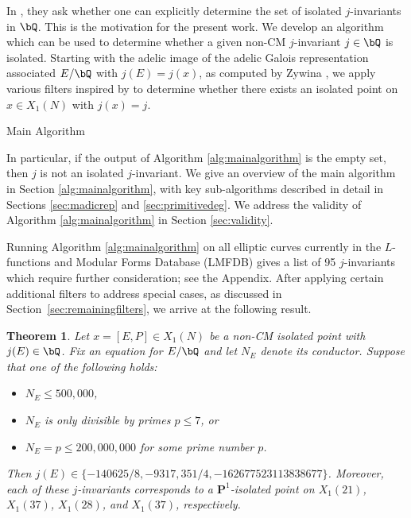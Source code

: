 \documentclass[11pt,reqno]{amsart}
\theoremstyle{plain}
\newtheorem{theorem}{Theorem}%
\theoremstyle{definition}
\newcommand{\Q}{\bQ}
\newcommand{\PP}{\mathbf P}
\begin{document}
In \cite{BELOV}, they ask whether one can explicitly determine the set of isolated $j$-invariants in $\Q$. This is the motivation for the present work. We develop an algorithm which can be used to determine whether a given non-CM $j$-invariant $j\in \Q$ is isolated. Starting with the adelic image of the adelic Galois representation associated $E/\Q$ with $j(E)=j(x)$, as computed by Zywina \cite{ZywinaAlgorithm}, we apply various filters inspired by \cite{BELOV} to determine whether there exists an isolated point on $x \in X_1(N)$ with $j(x)=j$.

\begin{algorithm}[h!]
\caption{Main Algorithm}
\KwIn{A non-CM $j$-invariant $j \in \Q$.}
\end{algorithm}

\noindent In particular, if the output of Algorithm \ref{alg:mainalgorithm} is the empty set, then $j$ is not an isolated $j$-invariant. We give an overview of the main algorithm in Section \ref{alg:mainalgorithm}, with key sub-algorithms described in detail in Sections \ref{sec:madicrep} and \ref{sec:primitivedeg}. We address the validity of Algorithm \ref{alg:mainalgorithm} in Section \ref{sec:validity}.

Running Algorithm \ref{alg:mainalgorithm} on all elliptic curves currently in the $L$-functions and Modular Forms Database (LMFDB) \cite{LMFDB} gives a list of 95 $j$-invariants which require further consideration; see the Appendix. After applying certain additional filters to address special cases, as discussed in Section~\ref{sec:remainingfilters}, we arrive at the following result.

\begin{theorem}\label{LMFDBoutputThm}
Let $x=[E,P]\in X_1(N)$ be a non-CM isolated point with $j(E) \in \Q$.
Fix an equation for $E/\Q$ and let $N_E$ denote its conductor.
Suppose that one of the following holds:
\begin{itemize}
    \item$N_E \leq 500{,}000$,
    \item $N_E$ is only divisible by primes $p \leq 7$, or
    \item $N_E=p \leq 200{,}000{,}000$ for some prime number $p$.
\end{itemize}
Then $j(E) \in \{-140625/8,-9317,351/4, -162677523113838677\}$. Moreover, each of these $j$-invariants corresponds to a $\PP^1$-isolated point on $X_1(21)$, $X_1(37)$, $X_1(28)$, and $X_1(37)$, respectively.
\end{theorem}
\end{document}
